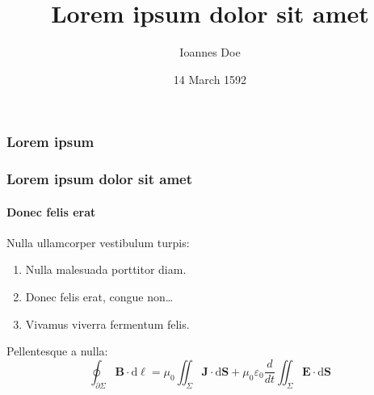 \documentclass[aspectratio=169]{beamer}
\title{Lorem ipsum dolor sit amet}
\date{14 March 1592}
\institute{University of Maximegalon}
\author{Ioannes Doe}
\begin{document}

\begin{frame}
\titlepage
\end{frame}


\begin{frame}%
	\frametitle{Lorem ipsum}%
	\lipsum[2]
\end{frame}


\begin{frame}%
	\frametitle{Lorem ipsum dolor sit amet}%
	\framesubtitle{Donec felis erat}%
	Nulla ullamcorper vestibulum turpis:
	\begin{enumerate}
		\item Nulla malesuada porttitor diam.
		\item Donec felis erat, congue non\dots
		\item Vivamus viverra fermentum felis.
	\end{enumerate}

	Pellentesque a nulla:
	\begin{equation*}
		\oint_{\partial \Sigma} \mathbf{B} \cdot \mathrm{d}\boldsymbol{\ell} = \mu_0 \iint_{\Sigma} \mathbf{J}
		\cdot \mathrm{d}\mathbf{S} + \mu_0 \varepsilon_0 \frac{d}{dt} \iint_{\Sigma} \mathbf{E}
		\cdot \mathrm{d}\mathbf{S}
	\end{equation*}
\end{frame}

\end{document}
